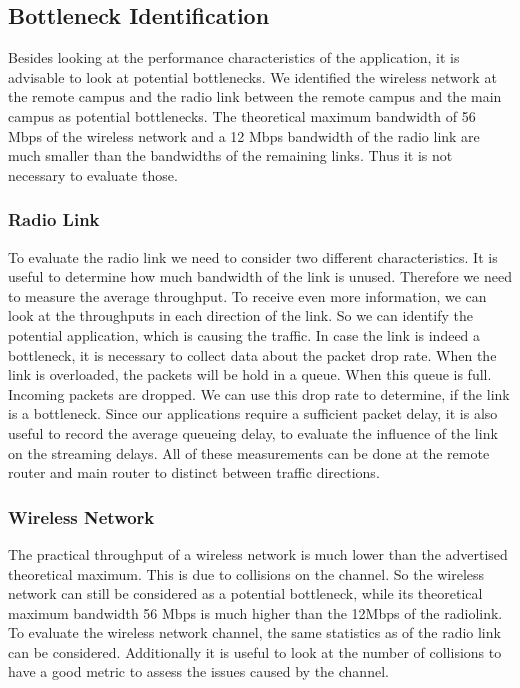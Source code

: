 \documentclass[
10pt, %
a4paper, %
oneside, %
headinclude,footinclude, %
BCOR5mm, %
]{scrartcl}
\begin{document}
\subsection{Bottleneck Identification}
Besides looking at the performance characteristics of the application, it is advisable to look at potential bottlenecks. We identified the wireless network at the remote campus and the radio link between the remote campus and the main campus as potential bottlenecks. The theoretical maximum bandwidth of 56 Mbps of the wireless network and a 12 Mbps bandwidth of the radio link are much smaller than the bandwidths of the remaining links. Thus it is not necessary to evaluate those.

\subsubsection{Radio Link}
To evaluate the radio link we need to consider two different characteristics. It is useful to determine how much bandwidth of the link is unused. Therefore we need to measure the average throughput. To receive even more information, we can look at the throughputs in each direction of the link. So we can identify the potential application, which is causing the traffic.
In case the link is indeed a bottleneck, it is necessary to collect data about the packet drop rate. When the link is overloaded, the packets will be hold in a queue. When this queue is full. Incoming packets are dropped. We can use this drop rate to determine, if the link is a bottleneck.
Since our applications require a sufficient packet delay, it is also useful to record the average queueing delay, to evaluate the influence of the link on the streaming delays.
All of these measurements can be done at the remote router and main router to distinct between traffic directions.

\subsubsection{Wireless Network}
The practical throughput of a wireless network is much lower than the advertised theoretical maximum. This is due to collisions on the channel. So the wireless network can still be considered as a potential bottleneck, while its theoretical maximum bandwidth 56 Mbps is much higher than the 12Mbps of the radiolink. To evaluate the wireless network channel, the same statistics as of the radio link can be considered.
Additionally it is useful to look at the number of collisions to have a good metric to assess the issues caused by the channel.
\end{document}
